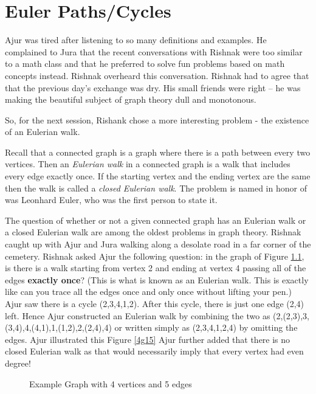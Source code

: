 \chapter{Euler Paths/Cycles}

Ajur was tired after listening to so many definitions and examples. He complained to Jura that the recent conversations with Rishnak were too similar to a math class and that he preferred to solve fun problems based on math concepts instead.  Rishnak overheard this conversation. Rishnak had to agree that that the previous day's exchange was dry. His small friends were right -- he was making the beautiful subject of graph theory dull and monotonous.

So, for the next session, Rishank chose a more interesting problem - the existence of an Eulerian walk. 

Recall that a connected graph is a graph where there is a path between every two vertices. Then an \emph{Eulerian walk} in a connected graph is a walk that includes every edge exactly once. If the starting vertex and the ending vertex are the same then the walk is called a \emph{closed Eulerian walk}. The problem is named in honor of was Leonhard Euler, who was the first person to state it.

The question of whether or not a given connected graph has an Eulerian walk or a closed Eulerian walk are among the oldest problems in graph theory. Rishnak caught up with Ajur and Jura walking along a desolate road in a far corner of the cemetery. Rishnak asked Ajur the following question: in the graph of Figure \ref{4g1}, is there is a walk starting from vertex 2 and ending at vertex 4 passing all of the edges \textbf{exactly once}? (This is what is known as an Eulerian walk. This is exactly like can you trace all the edges once and only once without lifting your pen.) Ajur saw there is a cycle (2,3,4,1,2). After this cycle, there is just one edge (2,4) left. Hence Ajur constructed an Eulerian walk by combining the two as (2,(2,3),3,(3,4),4,(4,1),1,(1,2),2,(2,4),4) or written simply as (2,3,4,1,2,4) by omitting the edges. Ajur illustrated this Figure \ref{4g15} Ajur further added that there is no closed Eulerian walk as that would necessarily imply that every vertex had even degree!


\begin{figure}
\begin{center}
\caption{ Example Graph with 4 vertices and 5 edges}\label{4g1}
\end{center}
\end{figure}

